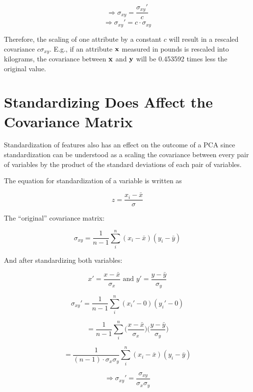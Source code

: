 \documentclass[fleqn]{article}
\begin{document}
\begin{equation} \Rightarrow \sigma_{xy} = \frac{\sigma_{xy}'}{c} \end{equation}
\begin{equation} \Rightarrow \sigma_{xy}' = c \cdot \sigma_{xy} \end{equation}

\noindent Therefore, the scaling of one attribute by a constant $c$ will result in a rescaled covariance $c \sigma_{xy}$. E.g., if an attribute $\bf{x}$ measured in pounds is rescaled  into kilograms, the covariance between $\bf{x}$ and $\bf{y}$ will be 0.453592 times less the original value.



\section{Standardizing Does Affect the Covariance Matrix}
\label{standardizingaffectsthecovariance}

Standardization of features also has an effect on the outcome of a PCA since standardization can be understood as a scaling the covariance between every pair of variables by the product of the standard deviations of each pair of variables.

\noindent The equation for standardization of a variable is written as 

\begin{equation} z = \frac{x_i - \bar{x}}{\sigma} \end{equation}

The ``original'' covariance matrix:

\begin{equation} \sigma_{xy} = \frac{1}{n-1} \sum_{i}^{n} (x_i - \bar{x})(y_i - \bar{y})   \end{equation}

And after standardizing both variables:

\begin{equation} x' = \frac{x - \bar{x}}{\sigma_x} \text{ and } y' =\frac{y - \bar{y}}{\sigma_y} \end{equation}

\begin{equation} \sigma_{xy}' =  \frac{1}{n-1} \sum_{i}^{n} (x_i' - 0)(y_i' - 0)   \end{equation}

\begin{equation}  =  \frac{1}{n-1} \sum_{i}^{n} \bigg(\frac{x - \bar{x}}{\sigma_x}\bigg)\bigg(\frac{y - \bar{y}}{\sigma_y}\bigg)   \end{equation}

\begin{equation}   = \frac{1}{(n-1) \cdot \sigma_x \sigma_y} \sum_{i}^{n} (x_i - \bar{x})(y_i - \bar{y})   \end{equation}

\begin{equation} \Rightarrow \sigma_{xy}' = \frac{\sigma_{xy}}{\sigma_x \sigma_y} \end{equation}
\end{document}
